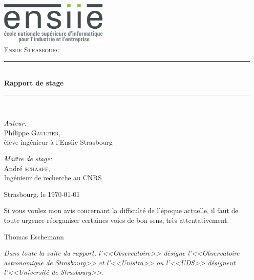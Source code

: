 \documentclass[a4paper,french,12pt]{article}
\newcommand{\HRule}{\rule{\linewidth}{0.5mm}}
\begin{document}
\begin{titlepage}
\begin{center}

\includegraphics[width=0.4\textwidth]{./logo_ENSIIE.png}~\\[1cm]
\textsc{\huge Ensiie Strasbourg}\\[1.5cm]

\HRule \\[0.4cm]
{
	\huge \bfseries Rapport de stage
\\[0.4cm] }
\HRule \\[1.5cm]

\begin{minipage}{0.4\textwidth}
\begin{flushleft} \huge
\emph{Auteur:}\\
Philippe \textsc{Gaultier},\\[0.5cm]
\Large élève ingénieur à l'Ensiie Strasbourg
\end{flushleft}
\end{minipage}
\begin{minipage}{0.4\textwidth}
\begin{flushright} \huge
\emph{Maître de stage:} \\
André \textsc{schaaff},\\[0.5cm]
\Large Ingénieur de recherche au CNRS
\end{flushright}
\end{minipage}

\vfill

{\large Strasbourg, le \today}



\end{center}
\end{titlepage}

\newpage
{
  \centering
  {
    \vspace{3cm}
  
    \vspace{3cm}
    \epigraph{Si vous voulez mon avis concernant la difficulté de l'époque
    actuelle, il faut de toute urgence réorganiser certaines voies de bon sens,
  très attentativement.}{Thomas Eschemann}
  }
}
\newpage
\textit{\normalsize Dans toute la suite du rapport, l'<<Observatoire>> désigne l'<<Observatoire astronomique de Strasbourg>>
et l'<<Unistra>> ou l'<<UDS>> désignent l'<<Université de Strasbourg>>.}
\setlength{\columnseprule}{0.5pt}
\end{document}
